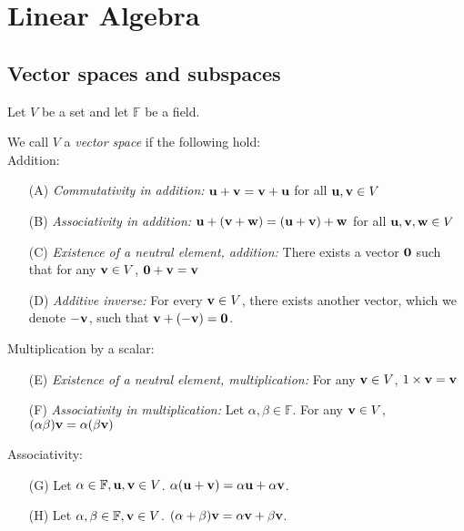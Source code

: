 \documentclass{article}
\begin{document}
\section{Linear Algebra}

\subsection{Vector spaces and subspaces}
Let $V$ be a set and let $\mathbb{F}$ be a field.

\begin{definition}
\label{def:vec_space}
We call $V$ a \emph{vector space} if the following hold: \\
Addition:
\begin{enumerate}
\setlength\itemsep{0.1em}
    \item[(A)] \textit{Commutativity in addition:} ${\mathbf{u}} + {\mathbf{v}} = {\mathbf{v}} + {\mathbf{u}}$ for all ${\mathbf{u}}, {\mathbf{v}} \in V$
    \item[(B)] \textit{Associativity in addition:} ${\mathbf{u}} + ({\mathbf{v}} + {\mathbf{w}}) = ({\mathbf{u}} + {\mathbf{v}}) + {\mathbf{w}}$ for all ${\mathbf{u}}, {\mathbf{v}}, {\mathbf{w}} \in V$
    \item[(C)] \textit{Existence of a neutral element, addition:} There exists a vector ${\mathbf{0}}$ such that for any ${\mathbf{v}} \in V$, ${\mathbf{0}} + {\mathbf{v}} = {\mathbf{v}}$
    \item[(D)] \textit{Additive inverse:} For every ${\mathbf{v}} \in V$, there exists another vector, which we denote $-{\mathbf{v}}$, such that ${\mathbf{v}} + (-{\mathbf{v}}) = {\mathbf{0}}$.
\end{enumerate}

Multiplication by a scalar:

\begin{enumerate}
\setlength\itemsep{0.1em}
    \item[(E)] \textit{Existence of a neutral element, multiplication:} For any ${\mathbf{v}} \in V$, $1\times {\mathbf{v}} = {\mathbf{v}}$
    \item[(F)] \textit{Associativity in multiplication:} Let $\alpha, \beta \in \mathbb{F}$. For any ${\mathbf{v}} \in V$, $(\alpha \beta) {\mathbf{v}} = \alpha (\beta {\mathbf{v}})$ 
\end{enumerate}

Associativity:
\begin{enumerate}
\setlength\itemsep{0.1em}
    \item[(G)] Let $\alpha \in \mathbb{F}, {\mathbf{u}}, {\mathbf{v}} \in V$. $\alpha ({\mathbf{u}} + {\mathbf{v}}) = \alpha {\mathbf{u}} + \alpha {\mathbf{v}}$.
    \item[(H)] Let $\alpha, \beta \in \mathbb{F}, {\mathbf{v}} \in V$. $(\alpha + \beta) {\mathbf{v}} = \alpha {\mathbf{v}} + \beta {\mathbf{v}}$.
\end{enumerate}
\end{definition}
\end{document}
